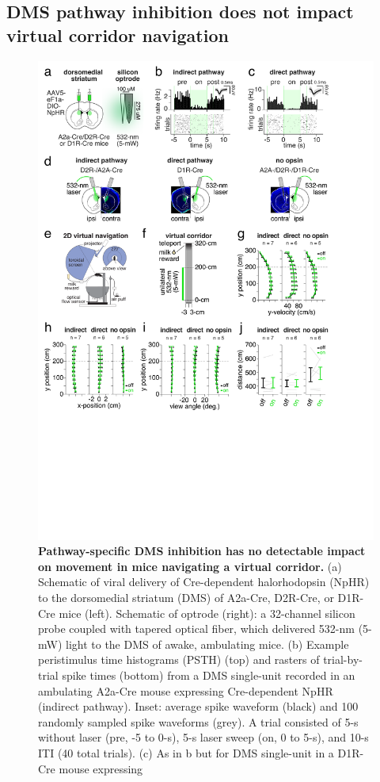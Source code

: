 \subsection{DMS pathway inhibition does not impact virtual corridor navigation}
\label{sec:glmhmm:2.2.2}


\begin{figure}[t!]
  \begin{center}
    \includegraphics[width=0.90\linewidth]{ch2-glmhmm/glmhmm-figures/Fig1.pdf}
    \caption[Pathway-specific DMS inhibition has no detectable impact on movement in mice navigating a virtual corridor]{\textbf{Pathway-specific DMS inhibition has no detectable impact on movement in mice navigating a virtual corridor.} (a) Schematic of viral delivery of Cre-dependent halorhodopsin (NpHR) to the dorsomedial striatum (DMS) of A2a-Cre, D2R-Cre, or D1R-Cre mice (left). Schematic of optrode (right): a 32-channel silicon probe coupled with tapered optical fiber, which delivered 532-nm (5-mW) light to the DMS of awake, ambulating mice. (b) Example peristimulus time histograms (PSTH) (top) and rasters of trial-by-trial spike times (bottom) from a DMS single-unit recorded in an ambulating A2a-Cre mouse expressing Cre-dependent NpHR (indirect pathway). Inset: average spike waveform (black) and 100 randomly sampled spike waveforms (grey). A trial consisted of 5-s without laser (pre, -5 to 0-s), 5-s laser sweep (on, 0 to 5-s), and 10-s ITI (40 total trials). (c) As in b but for DMS single-unit in a D1R-Cre mouse expressing}
    \label{fig:glmhmm:1}
  \end{center}
  \vspace{-1.5cm}
\end{figure}
